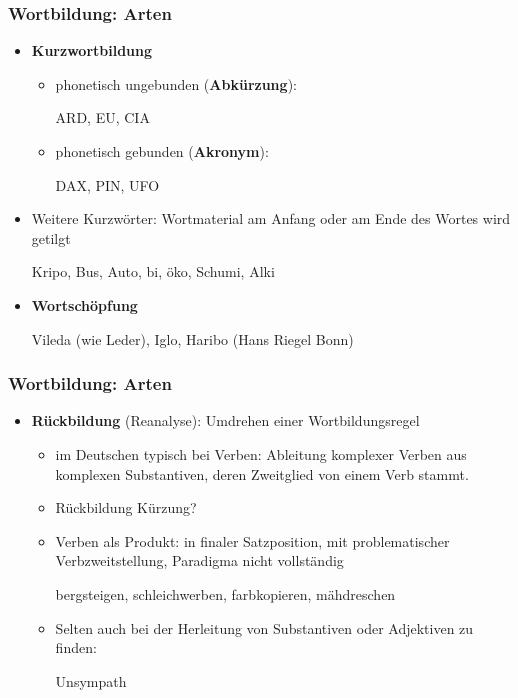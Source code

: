 \begin{frame}
\frametitle{Wortbildung: Arten}

\begin{itemize}
\item \textbf{Kurzwortbildung}

\begin{itemize}
	\item phonetisch ungebunden (\textbf{Abkürzung}):
	
	\ea ARD, EU, CIA
	\z
	
	\item phonetisch gebunden (\textbf{Akronym}):
	
	\ea DAX, PIN, UFO
	\z
	
\end{itemize}

\item Weitere Kurzwörter: Wortmaterial am Anfang oder am Ende des Wortes wird getilgt

\ea Kripo, Bus, Auto, bi, öko, Schumi, Alki
\z

\item \textbf{Wortschöpfung}

\ea Vileda (wie Leder), Iglo, Haribo (Hans Riegel Bonn)
\z

\end{itemize}

\end{frame}


\begin{frame}
\frametitle{Wortbildung: Arten}

\begin{itemize}
\item \textbf{Rückbildung} (Reanalyse): Umdrehen einer Wortbildungsregel

\begin{itemize}
\item im Deutschen typisch bei Verben: Ableitung komplexer Verben aus komplexen Substantiven, deren Zweitglied von einem Verb stammt.
\item Rückbildung \ras Kürzung?
\item Verben als Produkt: in finaler Satzposition, mit problematischer Verbzweitstellung, Paradigma nicht vollständig

\ea bergsteigen, schleichwerben, farbkopieren, mähdreschen
\z

\item Selten auch bei der Herleitung von Substantiven oder Adjektiven zu finden:

\ea Unsympath
\z

\end{itemize}
\end{itemize}


\end{frame}



